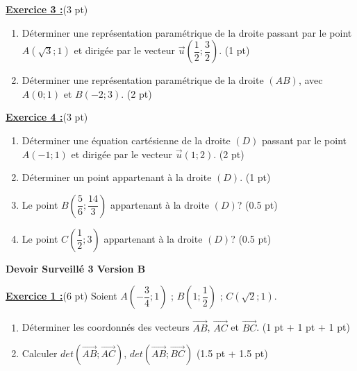 \documentclass[12pt,a4paper]{article}
\begin{document}
\underline{\large\textbf{Exercice 3 :}}(3 pt)
\begin{enumerate}
	\item Déterminer une représentation paramétrique de la droite passant par le point $A\left(\sqrt{3}; 1\right)$ et dirigée par le vecteur $\vec{u}\left(\dfrac{1}{2};\dfrac{3}{2}\right)$. (1 pt)
	\item Déterminer une représentation paramétrique de la droite $(AB)$, avec $A(0;1)$ et $B(-2;3)$. (2 pt)
\end{enumerate}

\underline{\large\textbf{Exercice 4 :}}(3 pt)
\begin{enumerate}
	\item Déterminer une équation cartésienne de la droite $(D)$ passant par le point $A(-1;1)$ et dirigée par le vecteur $\vec{u}(1;2)$. (2 pt)
	\item Déterminer un point appartenant à la droite $(D)$. (1 pt)
	\item Le point $B\left(\dfrac{5}{6}; \dfrac{14}{3}\right)$ appartenant à la droite $(D)$? (0.5 pt)
	\item Le point $C\left(\dfrac{1}{2}; 3\right)$ appartenant à la droite $(D)$? (0.5 pt)
\end{enumerate}

\newpage

\begin{center}
    \textbf{\Large  Devoir Surveillé 3 Version B}
\end{center}

\underline{\large\textbf{Exercice 1 :}}(6 pt)
Soient $A\left(-\dfrac{3}{4};1\right)$ ; $B\left(1;\dfrac{1}{2}\right)$ ; $C(\sqrt{2}; 1)$.
\begin{enumerate}
	\item Déterminer les coordonnés des vecteurs $\overrightarrow{AB}$, $\overrightarrow{AC}$ et $\overrightarrow{BC}$. (1 pt + 1 pt + 1 pt)
	\item Calculer $det(\overrightarrow{AB}; \overrightarrow{AC})$, $det(\overrightarrow{AB}; \overrightarrow{BC})$ (1.5 pt + 1.5 pt)
\end{enumerate}
\end{document}
